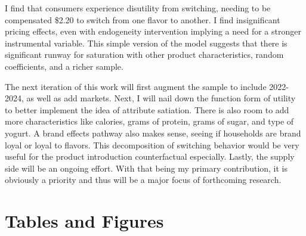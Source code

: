 \documentclass[11pt]{article}
\theoremstyle{definition}
\theoremstyle{remark}
\begin{document}
I find that consumers experience disutility from switching, needing to be compensated \$2.20 to switch from one flavor to another. I find insignificant pricing effects, even with endogeneity intervention implying a need for a stronger instrumental variable. This simple version of the model suggests that there is significant runway for saturation with other product characteristics, random coefficients, and a richer sample.

The next iteration of this work will first augment the sample to include 2022-2024, as well as add markets. Next, I will nail down the function form of utility to better implement the idea of attribute satiation. There is also room to add more characteristics like calories, grams of protein, grams of sugar, and type of yogurt. A brand effects pathway also makes sense, seeing if households are brand loyal or loyal to flavors. This decomposition of switching behavior would be very useful for the product introduction counterfactual especially. Lastly, the supply side will be an ongoing effort. With that being my primary contribution, it is obviously a priority and thus will be a major focus of forthcoming research.

\newpage



\newpage
\section{Tables and Figures}
\end{document}
